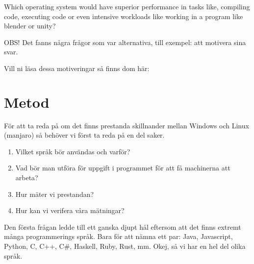 \documentclass[12pt, a4paper]{report}
\begin{document}
    \cite{form}
    \vspace{1cm}

    \large {Which operating system would have superior performance in tasks like, compiling code, executing code or even intensive workloads like working in a program  like blender or unity?}

    \vspace{.5cm}



    \cite{form}

    \vspace{1cm}


    \small{OBS! Det fanns några frågor som var alternativa, till exempel: att motivera sina svar.
    
    Vill ni läsa dessa motiveringar så finns dom här:} 


\section{Metod}

För att ta reda på om det finns prestanda skillnander mellan Windows och Linux (manjaro) så behöver vi först ta reda på en del saker.

\begin{enumerate}
    \item Vilket språk bör användas och varför?
    \item Vad bör man utföra för uppgift i programmet för att få machinerna att arbeta?
    \item Hur mäter vi prestandan?
    \item Hur kan vi verifera våra mätningar?
\end{enumerate}

Den första frågan ledde till ett ganska djupt hål eftersom att det finns extremt många programmerings språk. Bara för att nämna ett par: Java, Javascript, Python, C, C++, C\#, Haskell, Ruby, Rust, mm. Okej, så vi har en hel del olika språk.
\end{document}
